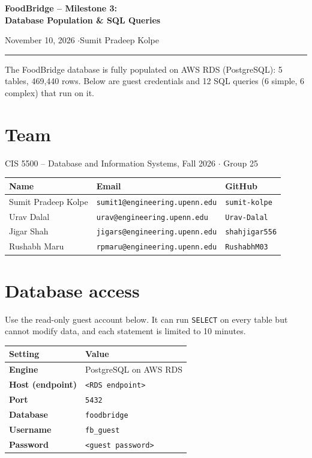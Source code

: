 \documentclass[11pt,letterpaper]{article}
\begin{document}
\begin{center}
  {\LARGE\bfseries FoodBridge -- Milestone 3:\\[4pt] Database Population \& SQL Queries\par}
  \vspace{8pt}
  {\normalsize\color{metaGray} November 10, 2026 \quad$\cdot$\quad Sumit Pradeep Kolpe\par}
  \vspace{4pt}
  {\color{ruleGray}\rule{\linewidth}{0.8pt}}
\end{center}

The FoodBridge database is fully populated on AWS RDS (PostgreSQL): 5 tables, 469,440 rows. Below are guest credentials and 12 SQL queries (6 simple, 6 complex) that run on it.

\section*{Team}
CIS 5500 -- Database and Information Systems, Fall 2026 $\cdot$ Group 25

\begin{center}
\begin{tabularx}{\linewidth}{>{\raggedright\arraybackslash}X l l}
\toprule
\textbf{Name} & \textbf{Email} & \textbf{GitHub} \\
\midrule
Sumit Pradeep Kolpe & \texttt{sumit1@engineering.upenn.edu} & \texttt{sumit-kolpe} \\
Urav Dalal & \texttt{urav@engineering.upenn.edu} & \texttt{Urav-Dalal} \\
Jigar Shah & \texttt{jigars@engineering.upenn.edu} & \texttt{shahjigar556} \\
Rushabh Maru & \texttt{rpmaru@engineering.upenn.edu} & \texttt{RushabhM03} \\
\bottomrule
\end{tabularx}
\end{center}

\section*{Database access}
Use the read-only guest account below. It can run \texttt{SELECT} on every table but cannot modify data, and each statement is limited to 10 minutes.

\begin{center}
\begin{tabularx}{0.75\linewidth}{>{\bfseries}l X}
\toprule
Setting & \textbf{Value} \\
\midrule
Engine & PostgreSQL on AWS RDS \\
Host (endpoint) & \texttt{<RDS endpoint>} \\
Port & \texttt{5432} \\
Database & \texttt{foodbridge} \\
Username & \texttt{fb\_guest} \\
Password & \texttt{<guest password>} \\
\bottomrule
\end{tabularx}
\end{center}
\end{document}
